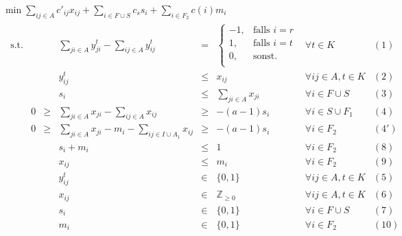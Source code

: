 \documentclass[11pt,a4paper]{article}
\newcommand{\Z}{\mathbb{Z}}
\theoremstyle{my_th_style1}
\begin{document}
  \bigskip
  $\min \displaystyle\sum_{ij \in A} c'_{ij} x_{ij} + \displaystyle\sum_{i \in F \cup S} c_s s_i + \displaystyle\sum_{i \in F_2} c(i) m_i$
  \begin{align*}
  \begin{array}{rcrcrcll}
  \textrm{s.t.}  
  && &\displaystyle\sum_{ji \in A} y_{ji}^t - \displaystyle\sum_{ij \in A} y_{ij}^t& = & \left\{\begin{array}{cl} 
  -1, & \text{falls } i=r\\ 
  1, & \text{falls } i=t\\ 
  0, & \text{sonst.}\\ 
  \end{array}
  \right. & \forall t \in K & (1) \\
  &&& y_{ij}^t & \leq & x_{ij} & \forall ij \in A, t\in K & (2)\\
    &&& s_i &\leq& \displaystyle\sum_{ji \in A} x_{ji}& \forall  i \in F \cup S & (3)\\ 
  &0&\geq&\displaystyle\sum_{ji \in A} x_{ji} - \displaystyle\sum_{ij \in A} x_{ij}&\geq& -(a-1)s_i & \forall i \in S \cup F_1& (4)\\
   &0&\geq&\displaystyle\sum_{ji \in A} x_{ji} -m_i - \displaystyle\sum_{ij \in I \cup A_1} x_{ij}&\geq& -(a-1)s_i & \forall i \in F_2& (4')\\
   &&&s_i+m_i & \leq & 1 & \forall i \in F_2 & (8)\\
   &&&x_{ij}& \leq & m_i & \forall i \in F_2 & (9) \\
    &&& y_{ij}^t & \in & \{0,1 \}& \forall ij \in A, t \in K & (5)\\
    &&& x_{ij} & \in & \Z_{\geq 0} & \forall ij \in A, t \in K & (6)\\
    &&& s_i & \in & \{ 0,1 \} & \forall i \in F \cup S & (7) \\
    &&& m_i & \in & \{ 0,1 \} & \forall i \in F_2 & (10) \\
  \end{array}
  \end{align*}
  
\end{document}
